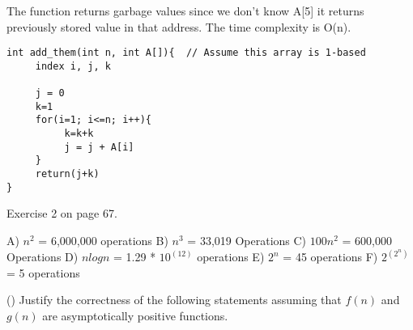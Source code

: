 \documentclass[11pt]{article}
\begin{document}
\begin{questions}

\begin{solutionorbox}
	\newline
	The function returns garbage values since we don't know A[5] it returns previously stored value in that address.
	\newline
	The time complexity is O(n).
\begin{verbatim}
int add_them(int n, int A[]){  // Assume this array is 1-based
     index i, j, k
	
     j = 0
     k=1
     for(i=1; i<=n; i++){
          k=k+k
          j = j + A[i]
     }
     return(j+k)
}
\end{verbatim}
\end{solutionorbox}

\ifprintanswers
\newpage
\else
\bigskip
\fi


\question[5]
Exercise 2 on page 67.

\begin{solutionorbox}
	A) $n^2$ = 6,000,000 operations\newline
	B) $n^3$ = 33,019 Operations\newline
	C) $100 n^2$ = 600,000 Operations\newline
	D) $n log n$ = 1.29 * $10^(12)$ operations\newline
	E) $2^n$ = 45 operations\newline
	F) $2^(2^n)$ = 5 operations
	
\end{solutionorbox}

\ifprintanswers
\newpage
\else
\bigskip
\fi


\question (\totalpoints {})
Justify the correctness of the following statements assuming that $f(n)$ and $g(n)$ are asymptotically positive functions.
\begin{parts}

\end{parts}
\end{questions}
\end{document}
